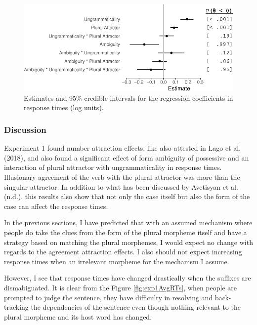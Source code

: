 \documentclass[doc]{apa6}
\begin{document}
\begin{figure}
\centering
\includegraphics{paper_draft_files/figure-latex/exp1ResponseTimeModelPlot-1.pdf}
\caption{\label{fig:exp1ResponseTimeModelPlot}Estimates and 95\% credible intervals for the regression coefficients in response times (log units).}
\end{figure}

\hypertarget{discussion}{%
\subsubsection{Discussion}\label{discussion}}

Experiment 1 found number attraction effects, like also attested in Lago et al. (2018), and also found a significant effect of form ambiguity of possessive and an interaction of plural attractor with ungrammaticality in response times. Illusionary agreement of the verb with the plural attractor was more than the singular attractor. In addition to what has been discussed by Avetisyan et al. (n.d.). this results also show that not only the case itself but also the form of the case can affect the response times.

In the previous sections, I have predicted that with an assumed mechanism where people do take the clues from the form of the plural morpheme itself and have a strategy based on matching the plural morphemes, I would expect no change with regards to the agreement attraction effects. I also should not expect increasing response times when an irrelevant morpheme for the mechanism I assume.

However, I see that response times have changed drastically when the suffixes are dismabiguated. It is clear from the Figure \ref{fig:exp1AvgRTs}, when people are prompted to judge the sentence, they have difficulty in resolving and back-tracking the dependencies of the sentence even though nothing relevant to the plural morpheme and its host word has changed.
\end{document}
